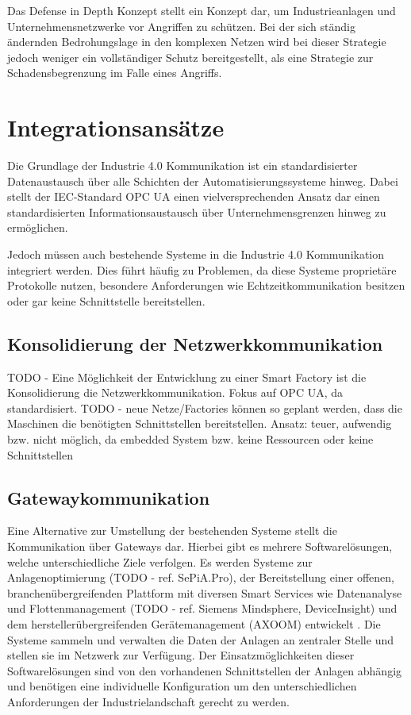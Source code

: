 \clearpage

Das Defense in Depth Konzept stellt ein Konzept dar, um Industrieanlagen und Unternehmensnetzwerke vor Angriffen zu schützen. Bei der sich ständig ändernden Bedrohungslage in den komplexen Netzen wird bei dieser Strategie jedoch weniger ein vollständiger Schutz bereitgestellt, als eine Strategie zur Schadensbegrenzung im Falle eines Angriffs.

\section{Integrationsansätze}
Die Grundlage der Industrie 4.0 Kommunikation ist ein standardisierter Datenaustausch über alle Schichten der Automatisierungssysteme hinweg. Dabei stellt der \ac{IEC}-Standard \ac{OPC UA} einen vielversprechenden Ansatz dar einen standardisierten Informationsaustausch über Unternehmensgrenzen hinweg zu ermöglichen. 

Jedoch müssen auch bestehende Systeme in die Industrie 4.0 Kommunikation integriert werden. Dies führt häufig zu Problemen, da diese Systeme proprietäre Protokolle nutzen, besondere Anforderungen wie Echtzeitkommunikation besitzen oder gar keine Schnittstelle bereitstellen.

\subsection{Konsolidierung der Netzwerkkommunikation}
TODO - Eine Möglichkeit der Entwicklung zu einer Smart Factory ist die Konsolidierung die Netzwerkkommunikation. Fokus auf OPC UA, da standardisiert.
TODO - neue Netze/Factories können so geplant werden, dass die Maschinen die benötigten Schnittstellen bereitstellen.
Ansatz: teuer, aufwendig bzw. nicht möglich, da embedded System bzw. keine Ressourcen oder keine Schnittstellen

\subsection{Gatewaykommunikation}
Eine Alternative zur Umstellung der bestehenden Systeme stellt die Kommunikation über Gateways dar. Hierbei gibt es mehrere Softwarelösungen, welche unterschiedliche Ziele verfolgen. Es werden Systeme zur Anlagenoptimierung (TODO - ref. SePiA.Pro), der Bereitstellung einer offenen, branchenübergreifenden Plattform mit diversen Smart Services wie Datenanalyse und Flottenmanagement (TODO - ref. Siemens Mindsphere, DeviceInsight) und dem herstellerübergreifenden Gerätemanagement (AXOOM) entwickelt \cite{acatec2016}. Die Systeme sammeln und verwalten die Daten der Anlagen an zentraler Stelle und stellen sie im Netzwerk zur Verfügung. Der Einsatzmöglichkeiten dieser Softwarelösungen sind von den vorhandenen Schnittstellen der Anlagen abhängig und benötigen eine individuelle Konfiguration um den unterschiedlichen Anforderungen der Industrielandschaft gerecht zu werden.


